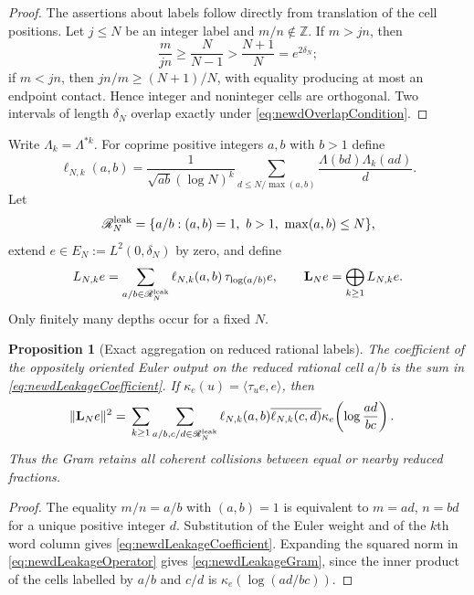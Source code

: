 \documentclass[11pt]{amsart}
\newtheorem{proposition}[theorem]{Proposition}
\theoremstyle{definition}
\theoremstyle{remark}
\newcommand{\Z}{\mathbb Z}
\begin{document}
\begin{proof}
The assertions about labels follow directly from translation of the cell
positions.  Let $j\leq N$ be an integer label and $m/n\notin\Z$.  If
$m>jn$, then
\[
 \frac{m}{jn}\geq\frac N{N-1}>\frac{N+1}{N}=e^{2\delta_N};
\]
if $m<jn$, then $jn/m\geq(N+1)/N$, with equality producing at most an
endpoint contact.  Hence integer and noninteger cells are orthogonal.
Two intervals of length $\delta_N$ overlap exactly under
\eqref{eq:newdOverlapCondition}.
\end{proof}

Write $\Lambda_k=\Lambda^{*k}$.  For coprime positive integers $a,b$ with
$b>1$ define
\begin{equation}\label{eq:newdLeakageCoefficient}
 \ell_{N,k}(a,b)=
 \frac1{\sqrt{ab}(\log N)^k}
 \sum_{d\leq N/\max(a,b)}
       \frac{\Lambda(bd)\Lambda_k(ad)}d.
\end{equation}
Let
\[
 \mathscr R_N^{\rm leak}
 =\{a/b:(a,b)=1,\ b>1,\ \max(a,b)\leq N\},
\]
extend $e\in E_N:=L^2(0,\delta_N)$ by zero, and define
\begin{equation}\label{eq:newdLeakageOperator}
 L_{N,k}e=\sum_{a/b\in\mathscr R_N^{\rm leak}}
   \ell_{N,k}(a,b)\,\tau_{\log(a/b)}e,
 \qquad
 \mathbf L_Ne=\bigoplus_{k\geq1}L_{N,k}e.
\end{equation}
Only finitely many depths occur for a fixed $N$.

\begin{proposition}[Exact aggregation on reduced rational labels]
\label{prop:newdRationalAggregation}
The coefficient of the oppositely oriented Euler output on the reduced
rational cell $a/b$ is the sum in
\eqref{eq:newdLeakageCoefficient}.  If
$\kappa_e(u)=\langle\tau_ue,e\rangle$, then
\begin{align}
 \|\mathbf L_Ne\|^2
 ={}&\sum_{k\geq1}
 \sum_{a/b,c/d\in\mathscr R_N^{\rm leak}}
 \ell_{N,k}(a,b)\overline{\ell_{N,k}(c,d)}
 \kappa_e\!\left(\log\frac{ad}{bc}\right).
 \label{eq:newdLeakageGram}
\end{align}
Thus the Gram retains all coherent collisions between equal or nearby
reduced fractions.
\end{proposition}

\begin{proof}
The equality $m/n=a/b$ with $(a,b)=1$ is equivalent to
$m=ad$, $n=bd$ for a unique positive integer $d$.  Substitution of the
Euler weight and of the $k$th word column gives
\eqref{eq:newdLeakageCoefficient}.  Expanding the squared norm in
\eqref{eq:newdLeakageOperator} gives
\eqref{eq:newdLeakageGram}, since the inner product of the cells labelled by
$a/b$ and $c/d$ is $\kappa_e(\log(ad/bc))$.
\end{proof}
\end{document}
